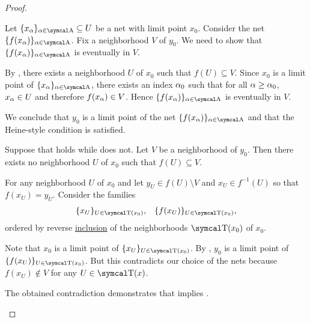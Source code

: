 \begin{proof}\mbox{}
  \begin{description}
     Let \( \{ x_\al \}_{\al \in \CA} \subseteq U \) be a net  with limit point \( x_0 \). Consider the net \( \{ f(x_\al) \}_{\al \in \CA} \). Fix a neighborhood \( V \) of \( y_0 \). We need to show that \( \{ f(x_\al) \}_{\al \in \CA} \) is eventually in \( V \).

    By , there exists a neighborhood \( U \) of \( x_0 \) such that \( f(U) \subseteq V \). Since \( x_0 \) is a limit point of \( \{ x_\al \}_{\al \in \CA} \), there exists an index \( \alpha_0 \) such that for all \( \alpha \geq \alpha_0 \), \( x_\alpha \in U \) and therefore \( f(x_\alpha) \in V \). Hence \( \{ f(x_\al) \}_{\al \in \CA} \) is eventually in \( V \).

    We conclude that \( y_0 \) is a limit point of the net \( \{ f(x_\al) \}_{\al \in \CA} \) and that the Heine-style condition is satisfied.

     Suppose that  holds while  does not\LEM. Let \( V \) be a neighborhood of \( y_0 \). Then there exists no neighborhood \( U \) of \( x_0 \) such that \( f(U) \subseteq V \).

    For any neighborhood \( U \) of \( x_0 \) and let \( y_U \in f(U) \setminus V \) and \( x_U \in f^{-1} (U) \) so that \( f(x_U) = y_U \). Consider the families
    \begin{align*}
      \{ x_U \}_{U \in \CT(x_0)},
      &&
      \{ f(x_U) \}_{U \in \CT(x_0)},
    \end{align*}
    ordered by reverse \hyperref[ex:reverse_inclusion_net]{inclusion} of the neighborhoods \( \CT(x_0) \) of \( x_0 \).

    Note that \( x_0 \) is a limit point of \( \{ x_U \}_{U \in \CT(x_0)} \). By , \( y_0 \) is a limit point of \( \{ f(x_U) \}_{U \in \CT(x_0)} \). But this contradicts our choice of the nets because \( f(x_U) \not\in V \) for any \( U \in \CT(x) \).

    The obtained contradiction demonstrates that  implies .
  \end{description}
\end{proof}

